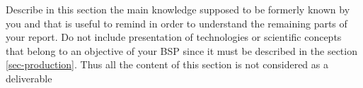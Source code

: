 {\color{gray}

Describe in this section the main knowledge supposed to be formerly
known by you and that is useful to remind in order to understand the
remaining parts of your report.  Do not include presentation of
technologies or scientific concepts that belong to an objective of
your BSP since it must be described in the section
\ref{sec-production}. Thus all the content of this section is not
considered as a deliverable

}
